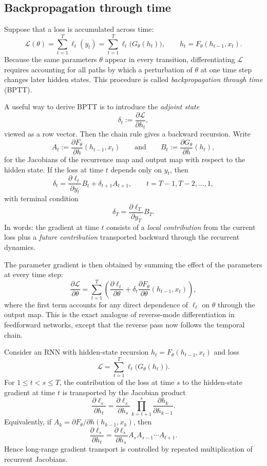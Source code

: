 \subsection*{Backpropagation through time}

Suppose that a loss is accumulated across time:
\[
\mathcal{L}(\theta)=\sum_{t=1}^{T} \ell_t(y_t)=\sum_{t=1}^{T} \ell_t\bigl(G_\theta(h_t)\bigr),
\qquad
h_t=F_\theta(h_{t-1},x_t).
\]
Because the same parameters $\theta$ appear in every transition, differentiating $\mathcal{L}$ requires accounting for all paths by which a perturbation of $\theta$ at one time step changes later hidden states.
This procedure is called \emph{backpropagation through time} (BPTT).

\medskip

A useful way to derive BPTT is to introduce the \emph{adjoint state}
\[
\delta_t := \frac{\partial \mathcal{L}}{\partial h_t},
\]
viewed as a row vector.
Then the chain rule gives a backward recursion.
Write
\[
A_t := \frac{\partial F_\theta}{\partial h}(h_{t-1},x_t)
\qquad\text{and}\qquad
B_t := \frac{\partial G_\theta}{\partial h}(h_t),
\]
for the Jacobians of the recurrence map and output map with respect to the hidden state.
If the loss at time $t$ depends only on $y_t$, then
\[
\delta_t
= \frac{\partial \ell_t}{\partial y_t} B_t
  + \delta_{t+1} A_{t+1},
\qquad t=T-1,T-2,\dots,1,
\]
with terminal condition
\[
\delta_T = \frac{\partial \ell_T}{\partial y_T} B_T.
\]
In words: the gradient at time $t$ consists of a \emph{local contribution} from the current loss plus a \emph{future contribution} transported backward through the recurrent dynamics.

\medskip

The parameter gradient is then obtained by summing the effect of the parameters at every time step:
\[
\frac{\partial \mathcal{L}}{\partial \theta}
=
\sum_{t=1}^{T}
\left(
\frac{\partial \ell_t}{\partial \theta}
+
\delta_t \frac{\partial F_\theta}{\partial \theta}(h_{t-1},x_t)
\right),
\]
where the first term accounts for any direct dependence of $\ell_t$ on $\theta$ through the output map.
This is the exact analogue of reverse-mode differentiation in feedforward networks, except that the reverse pass now follows the temporal chain.

\begin{proposition}
Consider an RNN with hidden-state recursion $h_t=F_\theta(h_{t-1},x_t)$ and loss
\[
\mathcal{L}=\sum_{t=1}^{T} \ell_t\bigl(G_\theta(h_t)\bigr).
\]
For $1 \leq t < s \leq T$, the contribution of the loss at time $s$ to the hidden-state gradient at time $t$ is transported by the Jacobian product
\[
\frac{\partial \ell_s}{\partial h_t}
=
\frac{\partial \ell_s}{\partial h_s}
\prod_{k=t+1}^{s}
\frac{\partial h_k}{\partial h_{k-1}}.
\]
Equivalently, if $A_k = \partial F_\theta/\partial h(h_{k-1},x_k)$, then
\[
\frac{\partial \ell_s}{\partial h_t}
=
\frac{\partial \ell_s}{\partial h_s} A_s A_{s-1}\cdots A_{t+1}.
\]
Hence long-range gradient transport is controlled by repeated multiplication of recurrent Jacobians.
\end{proposition}

